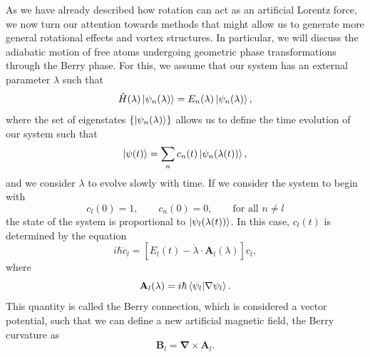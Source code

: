 As we have already described how rotation can act as an artificial Lorentz force, we now turn our attention towards methods that might allow us to generate more general rotational effects and vortex structures.
In particular, we will discuss the adiabatic motion of free atoms undergoing geometric phase transformations through the Berry phase. 
For this, we assume that our system has an external parameter $\lambda$ such that
\begin{equation}
\hat H(\lambda) \ket{\psi_n(\lambda)} = E_n(\lambda)\ket{\psi_n(\lambda)},
\end{equation}
where the set of eigenstates $\left\{ \ket{\psi_n(\lambda)} \right\}$ allows us to define the time evolution of our system such that
\begin{equation}
\ket{\psi(t)} = \sum_n c_n(t) \ket{\psi_n(\lambda(t))},
\end{equation}
and we consider $\lambda$ to evolve slowly with time. If we consider the system to begin with
\begin{equation}
c_l(0) = 1,
\qquad
c_n(0) = 0, 
\qquad
\text{for all } n\neq l
\end{equation}
the state of the system is proportional to $\ket{\psi_l(\lambda(t))}$.
In this case, $c_l(t)$ is determined by the equation
\begin{equation}
i \hbar \dot{c}_l =  [E_l(t) - \dot{\lambda} \cdot \mathbf{A}_l(\lambda)]c_l,
\label{Bcnx-1}
\end{equation}
where 
\begin{equation}
\mathbf{A}_l(\lambda) = i \hbar \braket{\psi_l|\nabla\psi_l}.
\label{eqn:Bcnx}
\end{equation}
This quantity is called the Berry connection, which is considered a vector potential, such that we can define a new artificial magnetic field, the Berry curvature as
\begin{equation}
\mathbf{B}_l = \mathbf{\nabla} \times \mathbf{A}_l.
\label{eqn:BC}
\end{equation}

